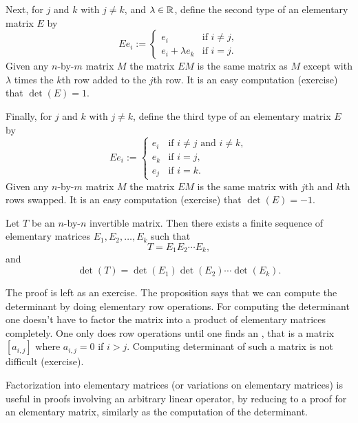 Next, for $j$ and $k$ with $j\neq k$, and $\lambda \in {\mathbb{R}}$,
define the second type of an elementary matrix $E$ by
\begin{equation*}
Ee_i := 
\begin{cases}
e_i               & \text{if } i \neq j , \\
e_i + \lambda e_k & \text{if } i = j .
\end{cases}
\end{equation*}
Given any $n$-by-$m$ matrix $M$ the matrix $EM$ is the same matrix as $M$
except with $\lambda$ times the $k$th row added to the $j$th row.
It is an easy computation (exercise) that $\det(E) = 1$.

Finally, for $j$ and $k$ with $j\neq k$, define
the third type of an elementary matrix $E$ by
\begin{equation*}
Ee_i := 
\begin{cases}
e_i & \text{if } i \neq j \text{ and } i \neq k , \\
e_k & \text{if } i = j , \\
e_j & \text{if } i = k .
\end{cases}
\end{equation*}
Given any $n$-by-$m$ matrix $M$ the matrix $EM$ is the same matrix with
$j$th and $k$th rows swapped.
It is an easy computation (exercise) that $\det(E) = -1$.

\begin{prop} \label{prop:elemmatrixdecomp}
Let $T$ be an $n$-by-$n$ invertible matrix.  Then there exists a finite
sequence of elementary matrices $E_1, E_2, \ldots, E_k$ such that
\begin{equation*}
T = E_1 E_2 \cdots E_k ,
\end{equation*}
and
\begin{equation*}
\det(T) = \det(E_1)\det(E_2)\cdots \det(E_k) .
\end{equation*}
\end{prop}

The proof is left as an exercise.  The proposition says that we can compute
the determinant by doing elementary row operations.  For computing the
determinant one doesn't have to factor the matrix into a product of
elementary matrices completely.  One only does row operations
until one finds an \emph{}, that is a matrix
$[a_{i,j}]$ where $a_{i,j} = 0$ if $i > j$.  Computing determinant of such a
matrix is not difficult (exercise).

Factorization into elementary matrices (or variations on elementary
matrices) is useful in proofs involving an arbitrary linear operator, by
reducing to a proof for an elementary matrix, similarly as the computation
of the determinant.


